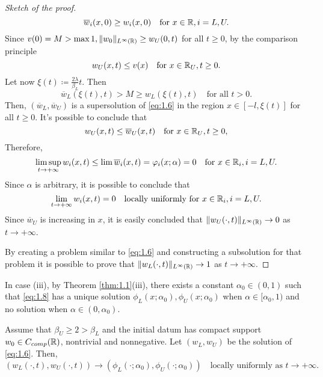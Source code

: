 \begin{proof}[Sketch of the proof]
    \[
        \overline{w}_i(x, 0) \geq w_i(x, 0) \quad \text{for } x \in \mathbb{R}, i = L, U.
    \] 
    Since \(v(0) = M > \max{1, \lVert w_0\rVert_{L^{\infty}(\mathbb{R})}} \geq w_U(0, t)\) for all \(t \geq 0\), by the comparison principle
    \[
        w_U(x, t) \leq v(x) \quad \text{for } x \in \mathbb{R}_U, t \geq 0.
    \]
    Let now \(\xi(t) \coloneqq \frac{2\lambda}{\beta_L} t\). Then 
    \[
        \overline{w}_L(\xi(t), t) > M \geq w_L(\xi(t), t) \quad \text{for all } t > 0.
    \]
    Then, \((\overline{w}_L, \overline{w}_U)\) is a supersolution of \eqref{eq:1.6} in the region \(x \in [-l, \xi(t)]\) for all \(t \geq 0\). It's possible to conclude that
    \[
        w_U(x, t) \leq \overline{w}_U(x, t) \quad \text{for } x \in \mathbb{R}_U, t \geq 0,
    \]
    Therefore,
    \[
        \limsup_{t \to +\infty} w_i(x, t) \leq \lim \overline{w}_i(x, t) = \varphi_i(x; \alpha) = 0 \quad \text{for } x \in \mathbb{R}_i, i = L, U.
    \]
    Since \(\alpha\) is arbitrary, it is possible to conclude that
    \[
        \lim_{t \to +\infty} w_i(x, t) = 0 \quad \text{locally uniformly for } x \in \mathbb{R}_i, i = L, U.
    \]
    Since \(\overline{w}_U\) is increasing in \(x\), it is easily concluded that \(\lVert w_U(\cdot, t)\rVert_{L^{\infty}(\mathbb{R})} \to 0\) as \(t \to +\infty\).

    By creating a problem similar to \eqref{eq:1.6} and constructing a subsolution for that problem it is possible to prove that \(\lVert w_L(\cdot, t)\rVert_{L^{\infty}(\mathbb{R})} \to 1\) as \(t \to +\infty\).
\end{proof}

In case (iii), by Theorem \ref{thm:1.1}(iii), there exists a constant \(\alpha_0 \in (0, 1)\) such that \eqref{eq:1.8} has a unique solution \(\phi_L(x; \alpha_0), \phi_U(x; \alpha_0)\) when \(\alpha \in [\alpha_0, 1)\) and no solution when \(\alpha \in (0, \alpha_0)\). 
\begin{theorem}
    Assume that \(\beta_U \geq 2 > \beta_L\) and the initial datum has compact support \(w_{0} \in C_{comp}(\mathbb{R})\), nontrivial and nonnegative. Let \((w_L, w_{U})\) be the solution of \eqref{eq:1.6}. Then,
    \begin{equation}
        (w_L(\cdot, t), w_{U}(\cdot, t)) \to (\phi_L(\cdot; \alpha_0), \phi_U(\cdot; \alpha_0)) \quad \text{locally uniformly as } t \to +\infty.
        \label{eq:3.6}
    \end{equation}
    \label{thm:3.3}
\end{theorem}

